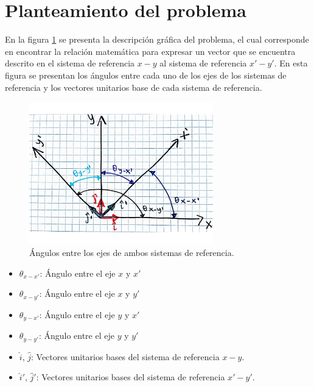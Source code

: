 \documentclass[12pt,letterpaper]{article}
\begin{document}
\section{Planteamiento del problema}
%
En la figura \ref{planteamiento} se presenta la descripción gráfica del problema, el cual corresponde en encontrar la relación matemática para expresar un vector que se encuentra descrito en el sistema de referencia $x-y$ al sistema de referencia $x'-y'$. En esta figura se presentan los ángulos entre cada uno de los ejes de los sistemas de referencia y los vectores unitarios base de cada sistema de referencia.\\
%
\begin{figure}[h]
	\centering
	\includegraphics[width=8cm]{img/Planteamiento.pdf}
	\caption{Ángulos entre los ejes de ambos sistemas de referencia.}
	\label{planteamiento}
\end{figure}
%
\begin{itemize}
	\item $\theta_{x-x'}$: Ángulo entre el eje $x$ y $x'$
	\item $\theta_{x-y'}$: Ángulo entre el eje $x$ y $y'$
	\item $\theta_{y-x'}$: Ángulo entre el eje $y$ y $x'$
	\item $\theta_{y-y'}$: Ángulo entre el eje $y$ y $y'$
	\item $\hat{i}$, $\hat{j}$: Vectores unitarios bases del sistema de referencia $x-y$.
	\item $\hat{i}'$, $\hat{j}'$: Vectores unitarios bases del sistema de referencia $x'-y'$.
\end{itemize}
%
%
\end{document}
